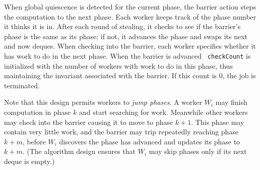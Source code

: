 When global quiescence is detected for the current phase, the barrier
action steps the computation to the next phase. Each worker keeps
track of the phase number it thinks it is in. After each round of
stealing, it checks to see if the barrier's phase is the same as its
phase; if not, it advances the phase and swaps its next and now
deques. When checking into the barrier, each worker specifies whether
it has work to do in the next phase. When the barrier is advanced {\tt
checkCount} is initialized with the number of workers with work to do in this phase, thus maintaining the
invariant associated with the barrier.  If this count is $0$, the job
is terminated.

Note that this design permits workers to {\em jump phases}. A worker
$W_i$ may finish computation in phase $k$ and start searching for
work. Meanwhile other workers may check into the barrier causing it to
move to phase $k+1$. This phase may contain very little work, and the
barrier may trip repeatedly reaching phase $k+m$, before $W_i$
discovers the phase has advanced and updates its phase to $k+m$. (The
algorithm design ensures that $W_i$ may skip phases only if its next
deque is empty.) 

